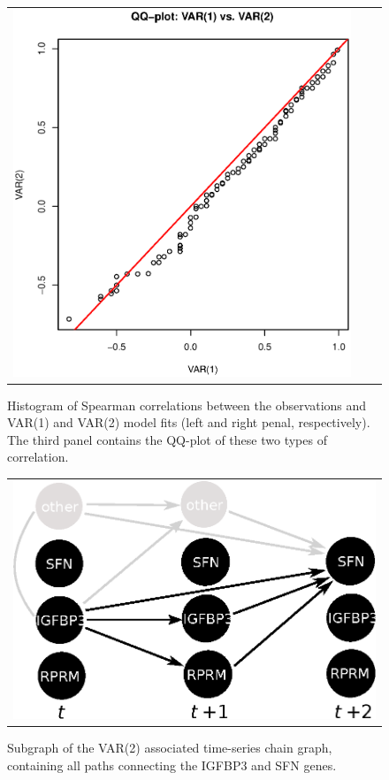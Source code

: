 \begin{figure}[h!]
\begin{tabular}{ccc}
\includegraphics[scale=0.275]{Figure_7c.eps}
\end{tabular}
\caption{Histogram of Spearman correlations between the observations and VAR(1) and VAR(2) model fits (left and right penal, respectively). The third panel contains the QQ-plot of these two types of correlation.} \label{fig:compVAR1-2}  
\end{figure}


\begin{figure}[h!]
\centering
\begin{tabular}{c}
\includegraphics[scale=0.58]{VAR2pathsExample.eps}
\end{tabular}
\caption{Subgraph of the VAR(2) associated time-series chain graph, containing all paths connecting the IGFBP3 and SFN genes.}
\label{fig:VAR2pathDecomposition}  
\end{figure}


